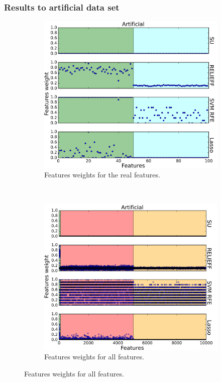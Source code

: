 \documentclass[twoside,11pt]{article}
\begin{document}
\subsubsection{Results to artificial data set}
\begin{figure}
  \centering 
  \begin{subfigure}[b]{0.48\textwidth}
      \includegraphics[width=\textwidth]{feature_weights_plot_artificial_only_features.png}
      \caption{Features weights for the real features.}
      \label{fig:feature_weights_plot_artificial_only_features}
  \end{subfigure}
  ~
  \begin{subfigure}[b]{0.48\textwidth}
    \includegraphics[width=\textwidth]{feature_weights_plot_artificial_all.png}
      \caption{Features weights for all features.}
      \label{fig:feature_weights_plot_artificial_all}
  \end{subfigure}


\end{figure}
\end{document}
